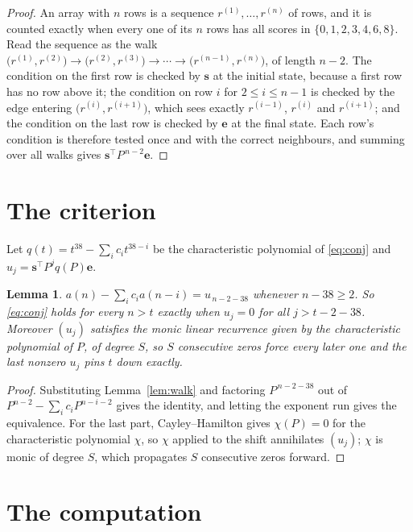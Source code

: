 \documentclass[11pt,a4paper]{article}
\theoremstyle{plain}
\newtheorem{lemma}[theorem]{Lemma}
\theoremstyle{definition}
\begin{document}
\begin{proof}
An array with $n$ rows is a sequence $r^{(1)},\dots,r^{(n)}$ of rows, and it is counted
exactly when every one of its $n$ rows has all scores in $\{0,1,2,3,4,6,8\}$. Read the sequence as the
walk $\bigl(r^{(1)},r^{(2)}\bigr)\to\bigl(r^{(2)},r^{(3)}\bigr)\to\cdots\to
\bigl(r^{(n-1)},r^{(n)}\bigr)$, of length $n-2$. The condition on the first row is
checked by $\mathbf{s}$ at the initial state, because a first row has no row above it; the
condition on row $i$ for $2\le i\le n-1$ is checked by the edge entering
$\bigl(r^{(i)},r^{(i+1)}\bigr)$, which sees exactly $r^{(i-1)}$, $r^{(i)}$ and
$r^{(i+1)}$; and the condition on the last row is checked by $\mathbf{e}$ at the final
state. Each row's condition is therefore tested once and with the correct neighbours, and
summing over all walks gives $\mathbf{s}^{\!\top}P^{\,n-2}\mathbf{e}$.
\end{proof}

\section{The criterion}

Let $q(t)=t^{38}-\sum_i c_i t^{38-i}$ be the characteristic polynomial of
\eqref{eq:conj} and $u_j=\mathbf{s}^{\!\top}P^{j}q(P)\mathbf{e}$.

\begin{lemma}\label{lem:crit}
$a(n)-\sum_i c_i a(n-i)=u_{\,n-2-38}$ whenever $n-38\ge2$. So \eqref{eq:conj}
holds for every $n>t$ exactly when $u_j=0$ for all $j>t-2-38$. Moreover $(u_j)$
satisfies the monic linear recurrence given by the characteristic polynomial of $P$, of
degree $S$, so $S$ consecutive zeros force every later one and the last nonzero $u_j$ pins
$t$ down exactly.
\end{lemma}

\begin{proof}
Substituting Lemma~\ref{lem:walk} and factoring $P^{\,n-2-38}$ out of
$P^{n-2}-\sum_i c_i P^{n-i-2}$ gives the identity, and letting the exponent run gives the
equivalence. For the last part, Cayley--Hamilton gives $\chi(P)=0$ for the characteristic
polynomial $\chi$, so $\chi$ applied to the shift annihilates $(u_j)$; $\chi$ is monic of
degree $S$, which propagates $S$ consecutive zeros forward.
\end{proof}

\section{The computation}
\end{document}
